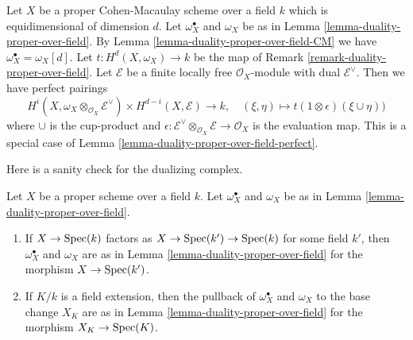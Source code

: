\begin{remark}
\label{remark-rework-duality-locally-free-CM}
Let $X$ be a proper Cohen-Macaulay scheme over a field $k$
which is equidimensional of dimension $d$.
Let $\omega_X^\bullet$ and $\omega_X$ be as in
Lemma \ref{lemma-duality-proper-over-field}.
By Lemma \ref{lemma-duality-proper-over-field-CM}
we have $\omega_X^\bullet = \omega_X[d]$.
Let $t : H^d(X, \omega_X) \to k$ be the map of
Remark \ref{remark-duality-proper-over-field}.
Let $\mathcal{E}$ be a finite locally free $\mathcal{O}_X$-module
with dual $\mathcal{E}^\vee$. Then we have perfect pairings
$$
H^i(X, \omega_X \otimes_{\mathcal{O}_X} \mathcal{E}^\vee)
\times
H^{d - i}(X, \mathcal{E})
\longrightarrow
k,\quad
(\xi, \eta) \longmapsto t(1 \otimes \epsilon)(\xi \cup \eta))
$$
where $\cup$ is the cup-product and
$\epsilon : \mathcal{E}^\vee \otimes_{\mathcal{O}_X} \mathcal{E}
\to \mathcal{O}_X$ is the evaluation map.
This is a special case of Lemma \ref{lemma-duality-proper-over-field-perfect}.
\end{remark}

\noindent
Here is a sanity check for the dualizing complex.

\begin{lemma}
\label{lemma-sanity-check-duality}
Let $X$ be a proper scheme over a field $k$. Let $\omega_X^\bullet$ and
$\omega_X$ be as in Lemma \ref{lemma-duality-proper-over-field}.
\begin{enumerate}
\item If $X \to \mathop{\mathrm{Spec}}(k)$ factors as $X \to \mathop{\mathrm{Spec}}(k') \to \mathop{\mathrm{Spec}}(k)$
for some field $k'$, then $\omega_X^\bullet$ and $\omega_X$
are as in Lemma \ref{lemma-duality-proper-over-field} for the morphism
$X \to \mathop{\mathrm{Spec}}(k')$.
\item If $K/k$ is a field extension, then the pullback of
$\omega_X^\bullet$ and $\omega_X$ to the base change $X_K$
are as in  Lemma \ref{lemma-duality-proper-over-field} for the morphism
$X_K \to \mathop{\mathrm{Spec}}(K)$.
\end{enumerate}
\end{lemma}

